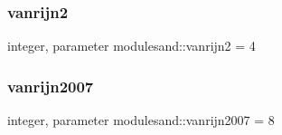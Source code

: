 \subsubsection{\texorpdfstring{vanrijn2}{vanrijn2}}
{\footnotesize\ttfamily integer, parameter modulesand\+::vanrijn2 = 4\hspace{0.3cm}{\ttfamily [private]}}

\mbox{\label{namespacemodulesand_ab870b94e2724314292f18ebbcf8d8d0a}} 
\subsubsection{\texorpdfstring{vanrijn2007}{vanrijn2007}}
{\footnotesize\ttfamily integer, parameter modulesand\+::vanrijn2007 = 8\hspace{0.3cm}{\ttfamily [private]}}

